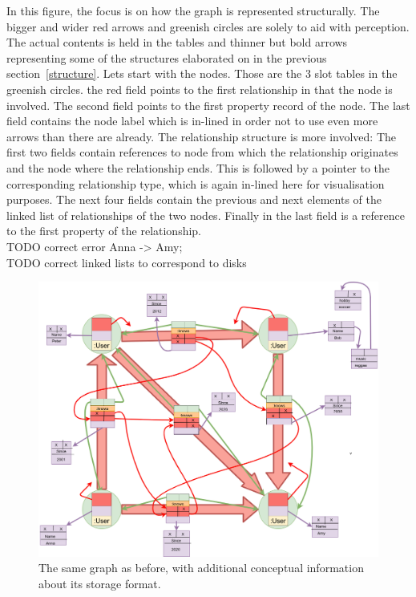 \documentclass[a4paper,10pt]{article}
\begin{document}
    In this figure, the focus is on how the graph is represented structurally. The bigger and wider red arrows and greenish circles are solely to aid with perception. The actual contents is held in the tables and thinner but bold arrows representing some of the structures elaborated on in the previous section~\ref{structure}. Lets start with the nodes. Those are the 3 slot tables in the greenish circles. the red field points to the first relationship in that the node is involved. The second field points to the first property record of the node. The last field contains the node label which is in-lined in order not to use even more arrows than there are already. The relationship structure is more involved: The first two fields contain references to node from which the relationship originates and the node where the relationship ends. This is followed by a pointer to the corresponding relationship type, which is again in-lined here for visualisation purposes. The next four fields contain the previous and next elements of the linked list of relationships of the two nodes. Finally in the last field is a reference to the first property of the relationship.\\
    TODO correct error Anna -> Amy; \\
    TODO correct linked lists to correspond to disks \\
    \begin{figure}[htp]\label{example_structs}
        \begin{center}
            \includegraphics[keepaspectratio,height=1.2\textheight,width=1.2\textwidth]{img/04_example/example_structs.png}
        \end{center}
        \caption{The same graph as before, with additional conceptual information about its storage format.} %
    \end{figure}
    
\end{document}
